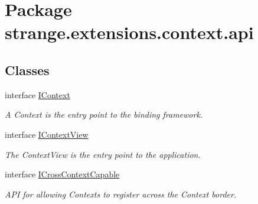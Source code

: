 \hypertarget{namespacestrange_1_1extensions_1_1context_1_1api}{\section{Package strange.\-extensions.\-context.\-api}
\label{namespacestrange_1_1extensions_1_1context_1_1api}
}
\subsection*{Classes}
\begin{DoxyCompactItemize}
\item 
interface \hyperlink{interfacestrange_1_1extensions_1_1context_1_1api_1_1_i_context}{I\-Context}
\begin{DoxyCompactList}\small\item\em A Context is the entry point to the binding framework. \end{DoxyCompactList}\item 
interface \hyperlink{interfacestrange_1_1extensions_1_1context_1_1api_1_1_i_context_view}{I\-Context\-View}
\begin{DoxyCompactList}\small\item\em The Context\-View is the entry point to the application. \end{DoxyCompactList}\item 
interface \hyperlink{interfacestrange_1_1extensions_1_1context_1_1api_1_1_i_cross_context_capable}{I\-Cross\-Context\-Capable}
\begin{DoxyCompactList}\small\item\em A\-P\-I for allowing Contexts to register across the Context border. \end{DoxyCompactList}\end{DoxyCompactItemize}
